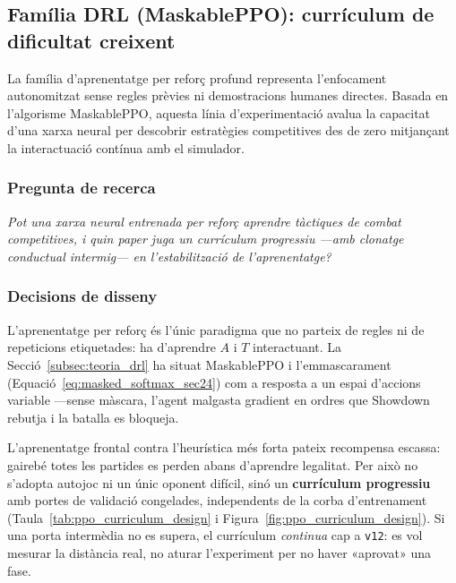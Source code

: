 \subsection{Família DRL (MaskablePPO): currículum de dificultat creixent}
\label{subsec:disseny_curriculum_ppo}

La família d'aprenentatge per reforç profund representa l'enfocament autonomitzat sense regles prèvies ni demostracions humanes directes. Basada en l'algorisme MaskablePPO, aquesta línia d'experimentació avalua la capacitat d'una xarxa neural per descobrir estratègies competitives des de zero mitjançant la interactuació contínua amb el simulador.

\subsubsection*{Pregunta de recerca}

\emph{Pot una xarxa neural entrenada per reforç aprendre tàctiques de combat competitives, i quin paper juga un currículum progressiu ---amb clonatge conductual intermig--- en l'estabilització de l'aprenentatge?}

\subsubsection*{Decisions de disseny}

L'aprenentatge per reforç és l'únic paradigma que no parteix de regles ni de repeticions etiquetades: ha d'aprendre $A$ i $T$ interactuant. La Secció~\ref{subsec:teoria_drl} ha situat MaskablePPO i l'emmascarament (Equació~\ref{eq:masked_softmax_sec24}) com a resposta a un espai d'accions variable ---sense màscara, l'agent malgasta gradient en ordres que Showdown rebutja i la batalla es bloqueja.

L'aprenentatge frontal contra l'heurística més forta pateix recompensa escassa: gairebé totes les partides es perden abans d'aprendre legalitat. Per això no s'adopta autojoc ni un únic oponent difícil, sinó un \textbf{currículum progressiu}~\cite{bengio_curriculum} amb portes de validació congelades, independents de la corba d'entrenament (Taula~\ref{tab:ppo_curriculum_design} i Figura~\ref{fig:ppo_curriculum_design}). Si una porta intermèdia no es supera, el currículum \emph{continua} cap a \texttt{v12}: es vol mesurar la distància real, no aturar l'experiment per no haver «aprovat» una fase.

